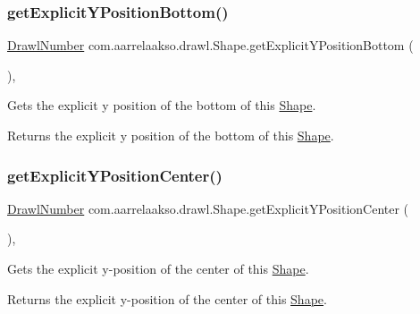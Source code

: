 \subsubsection{\texorpdfstring{get\+Explicit\+Y\+Position\+Bottom()}{getExplicitYPositionBottom()}}
{\footnotesize\ttfamily \hyperlink{classcom_1_1aarrelaakso_1_1drawl_1_1_drawl_number}{Drawl\+Number} com.\+aarrelaakso.\+drawl.\+Shape.\+get\+Explicit\+Y\+Position\+Bottom (\begin{DoxyParamCaption}{ }\end{DoxyParamCaption})\hspace{0.3cm}{\ttfamily [protected]}, {\ttfamily [inherited]}}



Gets the explicit y position of the bottom of this \hyperlink{classcom_1_1aarrelaakso_1_1drawl_1_1_shape}{Shape}. 

\begin{DoxyReturn}{Returns}
the explicit y position of the bottom of this \hyperlink{classcom_1_1aarrelaakso_1_1drawl_1_1_shape}{Shape}. 
\end{DoxyReturn}
\mbox{\label{classcom_1_1aarrelaakso_1_1drawl_1_1_shape_a602cb73f783f2856fa81e82bf7792263}} 
\subsubsection{\texorpdfstring{get\+Explicit\+Y\+Position\+Center()}{getExplicitYPositionCenter()}}
{\footnotesize\ttfamily \hyperlink{classcom_1_1aarrelaakso_1_1drawl_1_1_drawl_number}{Drawl\+Number} com.\+aarrelaakso.\+drawl.\+Shape.\+get\+Explicit\+Y\+Position\+Center (\begin{DoxyParamCaption}{ }\end{DoxyParamCaption})\hspace{0.3cm}{\ttfamily [protected]}, {\ttfamily [inherited]}}



Gets the explicit y-\/position of the center of this \hyperlink{classcom_1_1aarrelaakso_1_1drawl_1_1_shape}{Shape}. 

\begin{DoxyReturn}{Returns}
the explicit y-\/position of the center of this \hyperlink{classcom_1_1aarrelaakso_1_1drawl_1_1_shape}{Shape}. 
\end{DoxyReturn}
\mbox{\label{classcom_1_1aarrelaakso_1_1drawl_1_1_shape_a95f8a2f107299d91813627a95b3e0f0f}} 
